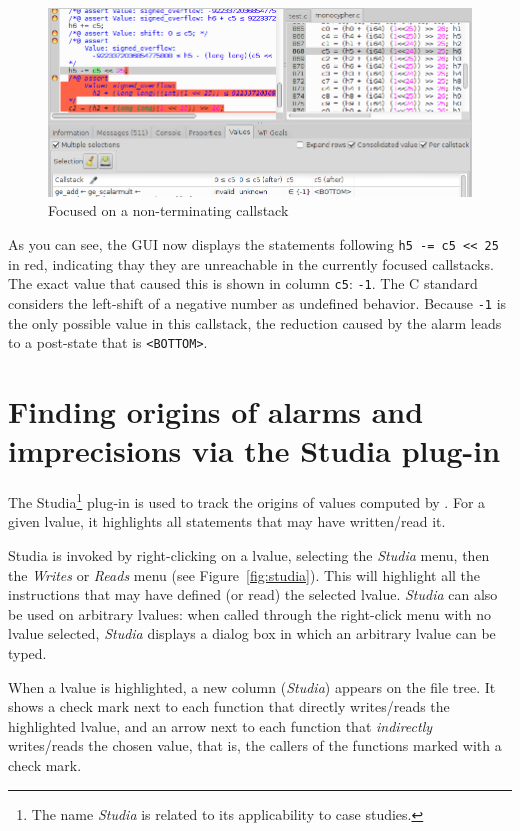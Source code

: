 \begin{figure}[hbt]
\centering
\includegraphics[width=\textwidth]{gui-images/gui5.png}
\caption{Focused on a non-terminating callstack}
\label{fig:non-term-callstack}
\end{figure}

As you can see, the GUI now displays the statements following
\texttt{h5\ -=\ c5\ \textless{}\textless{}\ 25} in red, indicating thay
they are unreachable in the currently focused callstacks. The exact
value that caused this is shown in column \texttt{c5}: \texttt{-1}. The
C standard considers the left-shift of a negative number as undefined
behavior. Because \texttt{-1} is the only possible value in this
callstack, the reduction caused by the alarm leads to a post-state that
is \texttt{\textless{}BOTTOM\textgreater{}}.

\section{Finding origins of alarms and imprecisions via the Studia plug-in}
\label{studia}

The Studia\footnote{The name \emph{Studia} is related to its applicability
to case studies.} plug-in is used to track the origins of values computed by \Eva{}.
For a given lvalue, it highlights all statements that may have written/read
it.

Studia is invoked by right-clicking on a lvalue, selecting the \emph{Studia}
menu, then the \emph{Writes} or \emph{Reads} menu (see Figure~\ref{fig:studia}).
This will highlight all the instructions that may have defined (or read)
the selected lvalue.
\emph{Studia} can also be used on arbitrary lvalues: when called through
the right-click menu with no lvalue selected, \emph{Studia} displays a
dialog box in which an arbitrary lvalue can be typed.

When a lvalue is highlighted, a new column (\emph{Studia}) appears on the
file tree. It shows a check mark next to each function that directly
writes/reads the highlighted lvalue, and an arrow next to each function
that \emph{indirectly} writes/reads the chosen value, that is, the callers of the
functions marked with a check mark.

